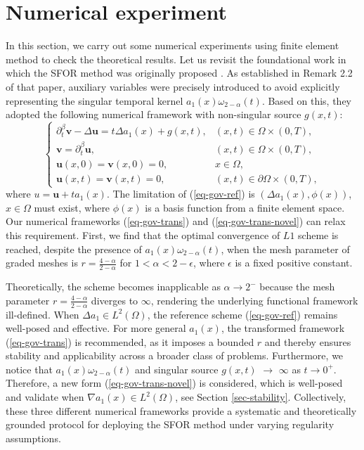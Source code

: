 \documentclass[11pt]{article}
\numberwithin{equation}{section}
\begin{document}
\section{Numerical experiment}\label{sec-num}
In this section, we carry out some numerical experiments using finite element method to check the theoretical results. Let us revisit the foundational work in which the SFOR method was originally proposed \cite{LyuP2022SFOR}. As established in Remark 2.2 of that paper, auxiliary variables were  precisely introduced to avoid explicitly representing the singular temporal kernel $a_1(x)\omega_{2-\alpha}(t)$. Based on this, they adopted the following numerical framework with non-singular source $g(x,t)$:
\begin{equation}\label{eq-gov-ref}
\begin{cases}
  \partial_t^\beta \textbf{v}  - \Delta \textbf{u} = t\Delta a_1(x)+g(x,t), & (x,t) \in \Omega \times (0,T), \\
  \textbf{v}  = \partial_t^\beta \textbf{u}, & (x,t) \in \Omega \times (0,T), \\
  \textbf{u}(x,0) = \textbf{v}(x,0)=0, & x \in \Omega, \\
  \textbf{u}(x,t) = \textbf{v}(x,t)=0, & (x,t) \in \partial \Omega \times (0,T),
\end{cases}
\end{equation}
where $u=\textbf{u}+ta_1(x)$. The limitation of (\ref{eq-gov-ref}) is $(\Delta a_1(x),\phi(x))$, $x\in\Omega$ must exist, where $\phi(x)$ is a basis function from a finite element space.
Our numerical frameworks (\ref{eq-gov-trans}) and (\ref{eq-gov-trans-novel}) can relax this requirement. First, we find that the optimal convergence of $L1$ scheme is reached, despite the presence of $a_1(x)\omega_{2-\alpha}(t)$, when the mesh parameter of graded meshes is $r=\frac{4-\alpha}{2-\alpha}$ for $1<\alpha<2-\epsilon$, where $\epsilon$ is a fixed positive constant.

Theoretically, the scheme becomes inapplicable as $\alpha\rightarrow2^-$ because the mesh parameter $r=\frac{4-\alpha}{2-\alpha}$ diverges to $\infty$, rendering the underlying functional framework ill-defined. When $\Delta a_1\in L^2(\Omega)$, the reference scheme (\ref{eq-gov-ref}) remains well-posed and effective. For more general $a_1(x)$, the transformed framework (\ref{eq-gov-trans}) is recommended, as it imposes a bounded $r$ and thereby ensures stability and applicability across a broader class of problems. Furthermore, we notice that $a_1(x)\omega_{2-\alpha}(t)$ and singular source $g(x,t)$ $\rightarrow$ $\infty$ as $t\rightarrow0^+$. Therefore, a new form (\ref{eq-gov-trans-novel}) is considered, which is well-posed and validate when $\nabla a_1(x)\in L^2(\Omega)$, see Section \ref{sec-stability}. Collectively, these three different numerical frameworks provide a systematic and theoretically grounded protocol for deploying the SFOR method under varying regularity assumptions.
\end{document}
